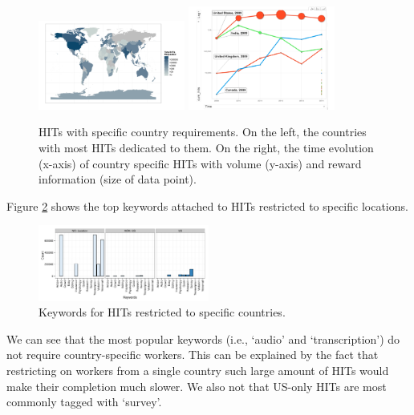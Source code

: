 \begin{figure}[htbp]
	\centering
		\includegraphics[width=0.43\textwidth]{figures/map}
		\includegraphics[width=0.43\textwidth]{figures/countriesTime}
	\caption{HITs with specific country requirements. On the left, the countries with most HITs dedicated to them. On the right, the time evolution (x-axis) of country specific HITs with volume (y-axis) and reward information (size of data point).}
	\label{fig:country}
\end{figure}

Figure \ref{fig:keyword_loc} shows the top keywords attached to HITs restricted to specific locations.
\begin{figure}[htbp]
	\centering
		\includegraphics[width=0.5\textwidth]{figures/keywords_location}
	\caption{Keywords for HITs restricted to specific countries.}
	\label{fig:keyword_loc}
\end{figure}
We can see that the most popular keywords (i.e., `audio' and `transcription') do not require country-specific workers. This can be explained by the fact that restricting on workers from a single country such large amount of HITs would make their completion much slower. We also not that US-only HITs are most commonly tagged with `survey'.


